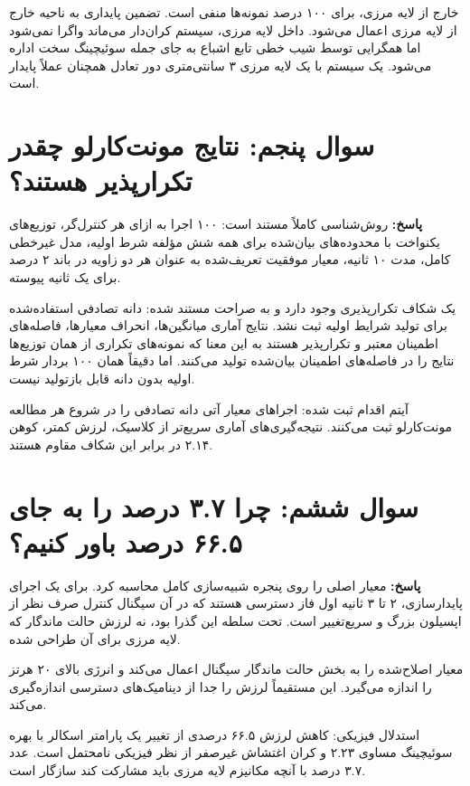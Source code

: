 \documentclass[12pt, a4paper]{article}
\newcommand{\dash}{\lr{---}}
\begin{document}
خارج از لايه مرزی،  برای ۱۰۰ درصد نمونه‌ها منفی است. تضمين پايداری به ناحيه خارج از لايه مرزی اعمال می‌شود. داخل لايه مرزی، سيستم کران‌دار می‌ماند \dash{} واگرا نمی‌شود \dash{} اما همگرايی توسط شيب خطی تابع اشباع به جای جمله سوئيچينگ سخت اداره می‌شود. يک سيستم با يک لايه مرزی ۳ سانتی‌متری دور تعادل همچنان عملاً پايدار است.

\section{سوال پنجم: نتايج مونت‌کارلو چقدر تکرارپذير هستند؟}

\textbf{پاسخ:} روش‌شناسی کاملاً مستند است: ۱۰۰ اجرا به ازای هر کنترل‌گر، توزيع‌های يکنواخت با محدوده‌های بيان‌شده برای همه شش مؤلفه شرط اوليه، مدل غيرخطی کامل، مدت ۱۰ ثانيه، معيار موفقيت تعريف‌شده به عنوان هر دو زاويه در باند ۲ درصد برای يک ثانيه پيوسته.

يک شکاف تکرارپذيری وجود دارد و به صراحت مستند شده: دانه تصادفی استفاده‌شده برای توليد شرايط اوليه ثبت نشد. نتايج آماری \dash{} ميانگين‌ها، انحراف معيارها، فاصله‌های اطمينان \dash{} معتبر و تکرارپذير هستند به اين معنا که نمونه‌های تکراری از همان توزيع‌ها نتايج را در فاصله‌های اطمينان بيان‌شده توليد می‌کنند. اما دقيقاً همان ۱۰۰ بردار شرط اوليه بدون دانه قابل بازتوليد نيست.

آيتم اقدام ثبت شده: اجراهای معيار آتی دانه تصادفی را در شروع هر مطالعه مونت‌کارلو ثبت می‌کنند. نتيجه‌گيری‌های آماری \dash{}  سريع‌تر از کلاسيک،  لرزش کمتر،  کوهن ۲.۱۴ \dash{} در برابر اين شکاف مقاوم هستند.

\section{سوال ششم: چرا ۳.۷ درصد را به جای ۶۶.۵ درصد باور کنيم؟}

\textbf{پاسخ:} معيار اصلی  را روی پنجره شبيه‌سازی کامل محاسبه کرد. برای يک اجرای پايدارسازی، ۲ تا ۳ ثانيه اول فاز دسترسی هستند که در آن سيگنال کنترل صرف نظر از اپسيلون بزرگ و سريع‌تغيير است.  تحت سلطه اين گذرا بود، نه لرزش حالت ماندگار که لايه مرزی برای آن طراحی شده.

معيار اصلاح‌شده  را به بخش حالت ماندگار سيگنال اعمال می‌کند و انرژی بالای ۲۰ هرتز را اندازه می‌گيرد. اين مستقيماً لرزش را جدا از ديناميک‌های دسترسی اندازه‌گيری می‌کند.

استدلال فيزيکی: کاهش لرزش ۶۶.۵ درصدی از تغيير يک پارامتر اسکالر با بهره سوئيچينگ  مساوی ۲.۲۳ و کران اغتشاش غيرصفر از نظر فيزيکی نامحتمل است. عدد ۳.۷ درصد با آنچه مکانيزم لايه مرزی بايد مشارکت کند سازگار است.
\end{document}
